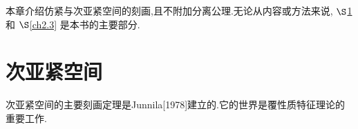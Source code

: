 \documentclass[main.tex]{subfiles}
\begin{document}
本章介绍仿紧与次亚紧空间的刻画,且不附加分离公理.无论从内容或方法来说, $\S$\ref{ch2.1} 和 $\S$\ref{ch2.3} 是本书的主要部分.

\section{次亚紧空间}\label{ch2.1}
次亚紧空间的主要刻画定理是Junnila[1978]建立的.它的世界是覆性质特征理论的重要工作.



	
\end{document}
